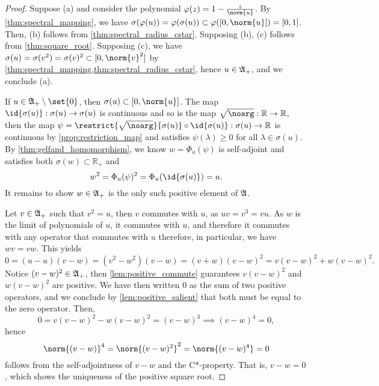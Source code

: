 \begin{proof}
    Suppose (a) and consider the polynomial \(\varphi(z) = 1 - \frac{z}{\norm{u}}\). By \cref{thm:spectral_mapping}, we have \(\sigma(\varphi(u)) = \varphi(\sigma(u)) \subset \varphi([0, \norm{u}]) = [0,1]\). Then, (b) follows from \cref{thm:spectral_radius_cstar}. Supposing (b), (c) follows from \cref{thm:square_root}. Supposing (c), we have \(\sigma(u) = \sigma(v^2) = \sigma(v)^2 \subset [0, \norm{v}^2]\) by \cref{thm:spectral_mapping,thm:spectral_radius_cstar}, hence \(u \in \mathfrak{A}_+\), and we conclude (a).

    If \(u \in \algebra{A}_+\setminus\set{0}\), then \(\sigma(u) \subset [0, \norm{u}]\). The map \(\id{\sigma(u)} : \sigma(u) \to \sigma(u)\) is continuous and so is the map \(\sqrt{\noarg} : \mathbb{R} \to \mathbb{R}\), then the map \(\psi = \restrict{\sqrt{\noarg}}{\sigma(u)} \circ \id{\sigma(u)} : \sigma(u) \to \mathbb{R}\) is continuous by \cref{prop:restriction_map} and satisfies \(\psi(\lambda) \geq 0\) for all \(\lambda \in \sigma(u)\). By \cref{thm:gelfand_homomorphism}, we know \(w = \Phi_u(\psi)\) is self-adjoint and satisfies both \(\sigma(w) \subset \mathbb{R}_+\) and
    \begin{equation*}
        w^2 = \Phi_u(\psi)^2 = \Phi_u(\id{\sigma(u)}) = u.
    \end{equation*}
    It remains to show \(w \in \mathfrak{A}_+\) is the only such positive element of \(\mathfrak{A}\).

    Let \(v \in \mathfrak{A}_+\) such that \(v^2 = u\), then \(v\) commutes with \(u\), as \(uv = v^3 = vu\). As \(w\) is the limit of polynomials of \(u\), it commutes with \(u\), and therefore it commutes with any operator that commutes with \(u\) therefore, in particular, we have \(wv = vw\). This yields
    \begin{equation*}
        0 = (u - u)(v - w) = (v^2 - w^2)(v - w) = (v + w)(v - w)^2 = v(v - w)^2 + w(v - w)^2.
    \end{equation*}
    Notice \((v - w)^2 \in \mathfrak{A}_+\), then \cref{lem:positive_commute} guarantees \(v(v - w)^2\) and \(w(v - w)^2\) are positive. We have then written \(0\) as the sum of two positive operators, and we conclude by \cref{lem:positive_salient} that both must be equal to the zero operator. Then,
    \begin{equation*}
        0 = v(v - w)^2 - w(v - w)^2 = (v - w)^3 \implies (v - w)^4 = 0,
    \end{equation*}
    hence
    \begin{equation*}
        \norm{(v - w)}^4 = \norm{(v - w)^2}^2 = \norm{(v - w)^4} = 0
    \end{equation*}
    follows from the self-adjointness of \(v - w\) and the C*-property. That is, \(v - w = 0\), which shows the uniqueness of the positive square root.
\end{proof}
